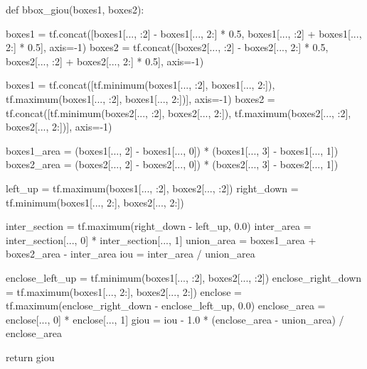 \documentclass[10pt,a4paper]{article}
\begin{document}
\begin{py}
def bbox_giou(boxes1, boxes2):

    boxes1 = tf.concat([boxes1[..., :2] - boxes1[..., 2:] * 0.5,
                        boxes1[..., :2] + boxes1[..., 2:] * 0.5], axis=-1)
    boxes2 = tf.concat([boxes2[..., :2] - boxes2[..., 2:] * 0.5,
                        boxes2[..., :2] + boxes2[..., 2:] * 0.5], axis=-1)

    boxes1 = tf.concat([tf.minimum(boxes1[..., :2], boxes1[..., 2:]),
                        tf.maximum(boxes1[..., :2], boxes1[..., 2:])], axis=-1)
    boxes2 = tf.concat([tf.minimum(boxes2[..., :2], boxes2[..., 2:]),
                        tf.maximum(boxes2[..., :2], boxes2[..., 2:])], axis=-1)

    boxes1_area = (boxes1[..., 2] - boxes1[..., 0]) * (boxes1[..., 3] - boxes1[..., 1])
    boxes2_area = (boxes2[..., 2] - boxes2[..., 0]) * (boxes2[..., 3] - boxes2[..., 1])

    left_up = tf.maximum(boxes1[..., :2], boxes2[..., :2])
    right_down = tf.minimum(boxes1[..., 2:], boxes2[..., 2:])

    inter_section = tf.maximum(right_down - left_up, 0.0)
    inter_area = inter_section[..., 0] * inter_section[..., 1]
    union_area = boxes1_area + boxes2_area - inter_area
    iou = inter_area / union_area

    enclose_left_up = tf.minimum(boxes1[..., :2], boxes2[..., :2])
    enclose_right_down = tf.maximum(boxes1[..., 2:], boxes2[..., 2:])
    enclose = tf.maximum(enclose_right_down - enclose_left_up, 0.0)
    enclose_area = enclose[..., 0] * enclose[..., 1]
    giou = iou - 1.0 * (enclose_area - union_area) / enclose_area

    return giou
\end{py}
\end{document}
